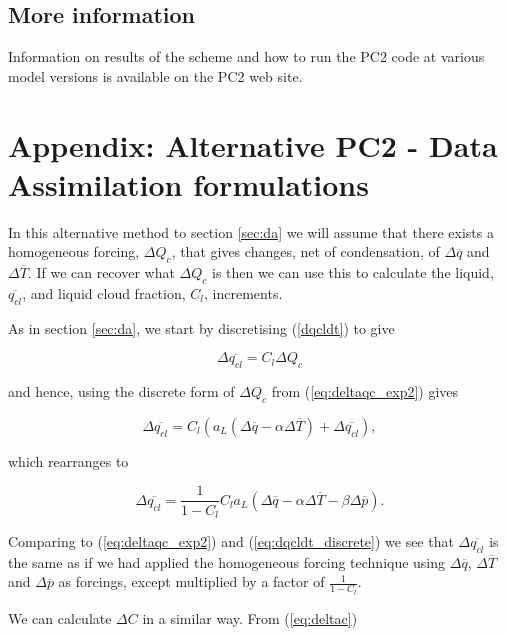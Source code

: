 \documentclass{UMDP_article}
\begin{document}
\subsection{More information}

Information on results of the scheme and how to run the PC2 code at
various model versions is available on the PC2 web site.

\section{Appendix: Alternative PC2 - Data Assimilation formulations}
\label{sec:appendix-da}

In this alternative method to section \ref{sec:da} we will assume that there
exists a homogeneous forcing, $\Delta Q_c$,
that gives changes, net of condensation, of $\Delta\overline{q}$ and
$\Delta\overline{T}$. If we can recover
what $\Delta Q_c$ is then we can use this to calculate the liquid,
$\overline{q_{cl}}$, and liquid cloud fraction, $C_l$, increments.

As in section \ref{sec:da}, we start by discretising (\ref{dqcldt}) to give

\begin{equation}
\Delta \overline{q_{cl}} = C_l \Delta Q_c
\label{eq:dqcldt_discrete}
\end{equation}

and hence, using the discrete form of $\Delta Q_c$ from
(\ref{eq:deltaqc_exp2}) gives

\begin{equation}
\Delta \overline{q_{cl}} = C_l ( a_L ( \Delta \overline{q} - \alpha \Delta 
\overline{T} ) + \Delta \overline{q_{cl}} ) ,
\end{equation}

which rearranges to

\begin{equation}
\Delta \overline{q_{cl}} = \frac{1}{1-C_l} C_l a_L ( \Delta \overline{q}
- \alpha \Delta \overline{T} - \beta \Delta \overline{p}) .
\label{eqn:delataqcl}
\end{equation}

Comparing to (\ref{eq:deltaqc_exp2}) and (\ref{eq:dqcldt_discrete}) we see that
$\Delta \overline{q_{cl}} $ is the same as if we had applied the
homogeneous forcing technique
using $\Delta \overline{q}$, $\Delta \overline{T}$ and $\Delta \overline{p}$ as
forcings, except multiplied by a factor of $\frac{1}{1-C_l}$.

We can calculate $\Delta C$ in a similar way. From (\ref{eq:deltac})
\end{document}
